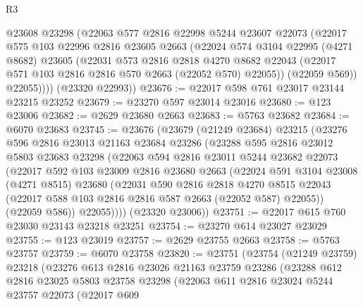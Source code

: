 \begin{lexlean}{R3}
\begin{coremodule}
          @23608
          @23298
          (@22063
            @577
            @2816
            @22998
            @5244
            @23607
            @22073
            (@22017
              @575
              @103
              @22996
              @2816
              @23605
              @2663
              (@22024
                @574
                @3104
                @22995
                (@4271 @8682)
                @23605
                (@22031
                  @573
                  @2816
                  @2818
                  @4270
                  @8682
                  @22043
                  (@22017 @571 @103 @2816 @2816 @570 @2663 (@22052 @570) @22055))
                (@22059 @569))
              @22055))))
      (@23320 @22993))
@23676 := @22017 @598 @761 @23017 @23144 @23215 @23252
@23679 := @23270 @597 @23014 @23016
@23680 := @123 @23006
@23682 := @2629 @23680 @2663
@23683 := @5763 @23682
@23684 := @6070 @23683
@23745 := @23676
    (@23679
      (@21249 @23684)
      @23215
      (@23276
        @596
        @2816
        @23013
        @21163
        @23684
        @23286
        (@23288
          @595
          @2816
          @23012
          @5803
          @23683
          @23298
          (@22063
            @594
            @2816
            @23011
            @5244
            @23682
            @22073
            (@22017
              @592
              @103
              @23009
              @2816
              @23680
              @2663
              (@22024
                @591
                @3104
                @23008
                (@4271 @8515)
                @23680
                (@22031
                  @590
                  @2816
                  @2818
                  @4270
                  @8515
                  @22043
                  (@22017 @588 @103 @2816 @2816 @587 @2663 (@22052 @587) @22055))
                (@22059 @586))
              @22055))))
      (@23320 @23006))
@23751 := @22017 @615 @760 @23030 @23143 @23218 @23251
@23754 := @23270 @614 @23027 @23029
@23755 := @123 @23019
@23757 := @2629 @23755 @2663
@23758 := @5763 @23757
@23759 := @6070 @23758
@23820 := @23751
    (@23754
      (@21249 @23759)
      @23218
      (@23276
        @613
        @2816
        @23026
        @21163
        @23759
        @23286
        (@23288
          @612
          @2816
          @23025
          @5803
          @23758
          @23298
          (@22063
            @611
            @2816
            @23024
            @5244
            @23757
            @22073
            (@22017
              @609

\end{coremodule}
\end{lexlean}

